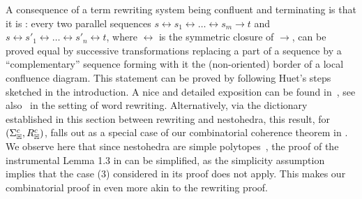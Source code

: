 \begin{rem}
  \label{rem:coherence}
A consequence of a term rewriting system  being confluent and terminating is that it is :
every two parallel  sequences
 $s\leftrightarrow s_1 \leftrightarrow \ldots \leftrightarrow s_m\to t$ and $s\leftrightarrow s'_1 \leftrightarrow \ldots \leftrightarrow s'_n\leftrightarrow t$, where $\leftrightarrow$ is the symmetric closure of $\to$,  can be proved equal by successive transformations replacing a part of a  sequence by a ``complementary''  sequence forming with it the (non-oriented) border of a local confluence diagram. 
 This statement can be proved by following Huet's steps sketched in the introduction.  
 A nice and detailed exposition can be found in~\cite{Beke-Knuth}, see also~\cite{GM-FDT} in the 
 setting of word rewriting.
 Alternatively, via the dictionary  established in this section between rewriting and nestohedra, this result, for $(\Sigma_{\mathbb H}^c ,R_{\mathbb H}^c)$, falls out as a special case of our combinatorial coherence theorem in \cite[Thm~1.4 \& Prop.~1.7]{CLA1}. 
 We observe here that since nestohedra are simple polytopes~\cite[Sec.~9]{DP-HP}, the proof of the instrumental Lemma 1.3 in \cite{CLA1} can be simplified, as the simplicity assumption implies that the case (3) considered in its proof does not apply. 
 This makes our combinatorial proof in \cite{CLA1} even more akin to the rewriting proof.
 \end{rem}



